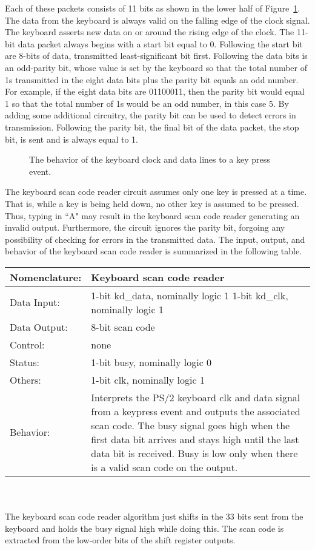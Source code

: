 Each of these packets consists of 11 bits as shown in the lower half 
of Figure~\ref{fig:datapathControlKeyboard}.  The data from the keyboard is always 
valid on the falling edge of the clock signal.  The keyboard asserts
new data on or around the rising edge of the clock.  The 11-bit data 
packet always begins with a start bit equal to 0.  Following the
start bit are 8-bits of data, transmitted least-significant bit first.
Following the data bits is an odd-parity bit, whose value is set by the 
keyboard so that the total number of 1s transmitted in the eight data
bits plus the parity bit equals an odd number.  For example, if the
eight data bits are 01100011, then the parity bit would equal 1 so that 
the total number of 1s would be an odd number, in this case 5.  By
adding some additional circuitry, the parity bit can be used to detect 
errors in transmission.   Following the parity bit, the final bit of
the data packet, the stop bit, is sent and is always equal to 1.

\begin{figure}[ht]
\caption{The behavior of the keyboard clock and data lines to a 
key press event.}
\label{fig:datapathControlKeyboard}
\end{figure}

The keyboard scan code reader circuit assumes only one key is
pressed at a time.  That is, while a key is being held down,  
no other key is assumed to be pressed.  Thus, typing in ``A" may 
result in the keyboard scan code reader generating an invalid output. 
Furthermore, the circuit ignores the parity bit, forgoing any 
possibility of checking for errors in the transmitted data.  The
input, output, and behavior of the keyboard scan code reader is
summarized in the following table.

\begin{tabular}{|l|p{3.5in}|} \hline
Nomenclature:  & Keyboard scan code reader		\\ \hline
Data Input:    & 1-bit kd\_data, nominally logic 1
		 1-bit kd\_clk, nominally logic 1	\\ \hline
Data Output:   & 8-bit scan code				\\ \hline
Control:       & none					\\ \hline
Status:        & 1-bit busy, nominally logic 0		\\ \hline
Others:        & 1-bit clk, nominally logic 1		\\ \hline
Behavior:      & Interprets the PS/2 keyboard clk and data signal
		from a keypress event and outputs the associated
		scan code.  The busy signal goes high when the
		first data bit arrives and stays high until the
		last data bit is received.  Busy is low only when
		there is a valid scan code on the output. \\ \hline
\end{tabular}
\\ \\
The keyboard scan code reader algorithm just shifts in the 33 bits
sent from the keyboard and holds the busy signal high while doing 
this.  The scan code is extracted from the low-order bits of the shift
register outputs.

